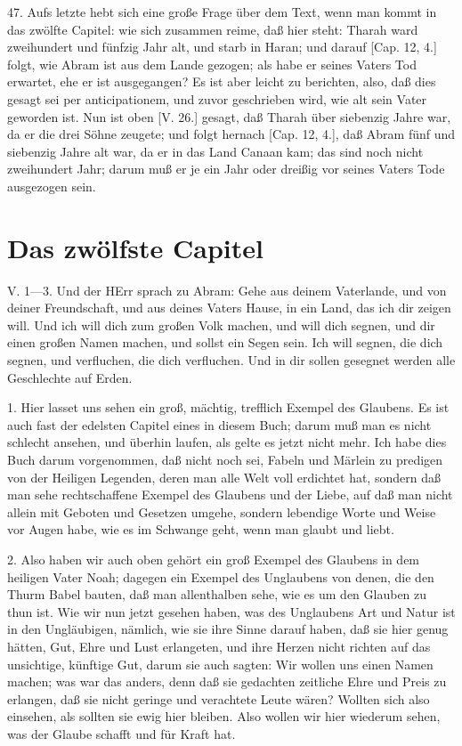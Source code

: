 47. Aufs letzte hebt sich eine große Frage über dem Text, wenn man kommt in das zwölfte Capitel: wie sich zusammen reime, daß hier steht: Tharah ward zweihundert und fünfzig Jahr alt, und starb in Haran; und darauf [Cap. 12, 4.] folgt, wie Abram ist aus dem Lande gezogen; als habe er seines Vaters Tod erwartet, ehe er ist ausgegangen? Es ist aber leicht zu berichten, also, daß dies gesagt sei per anticipationem, und zuvor geschrieben wird, wie alt sein Vater geworden ist. Nun ist oben [V. 26.] gesagt, daß Tharah über siebenzig Jahre war, da er die drei Söhne zeugete; und folgt hernach [Cap. 12, 4.], daß Abram fünf und siebenzig Jahre alt war, da er in das Land Canaan kam; das sind noch nicht zweihundert Jahr; darum muß er je ein Jahr oder dreißig vor seines Vaters Tode ausgezogen sein.

\section{Das zwölfste Capitel}

\begin{schriftzitat}
V. 1—3. Und der HErr sprach zu Abram: Gehe aus deinem Vaterlande, und von deiner Freundschaft, und aus deines Vaters Hause, in ein Land, das ich dir zeigen will. Und ich will dich zum großen Volk machen, und will dich segnen, und dir einen großen Namen machen, und sollst ein Segen sein. Ich will segnen, die dich segnen, und verfluchen, die dich verfluchen. Und in dir sollen gesegnet werden alle Geschlechte auf Erden.
\end{schriftzitat}

1. Hier lasset uns sehen ein groß, mächtig, trefflich Exempel des Glaubens. Es ist auch fast der edelsten Capitel eines in diesem Buch; darum muß man es nicht schlecht ansehen, und überhin laufen, als gelte es jetzt nicht mehr. Ich habe dies Buch darum vorgenommen, daß nicht noch sei, Fabeln und Märlein zu predigen von der Heiligen Legenden, deren man alle Welt voll erdichtet hat, sondern daß man sehe rechtschaffene Exempel des Glaubens und der Liebe, auf daß man nicht allein mit Geboten und Gesetzen umgehe, sondern lebendige Worte und Weise vor Augen habe, wie es im Schwange geht, wenn man glaubt und liebt.

2. Also haben wir auch oben gehört ein groß Exempel des Glaubens in dem heiligen Vater Noah; dagegen ein Exempel des Unglaubens von denen, die den Thurm Babel bauten, daß man allenthalben sehe, wie es um den Glauben zu thun ist. Wie wir nun jetzt gesehen haben, was des Unglaubens Art und Natur ist in den Ungläubigen, nämlich, wie sie ihre Sinne darauf haben, daß sie hier genug hätten, Gut, Ehre und Lust erlangeten, und ihre Herzen nicht richten auf das unsichtige, künftige Gut, darum sie auch sagten: Wir wollen uns einen Namen machen; was war das anders, denn daß sie gedachten zeitliche Ehre und Preis zu erlangen, daß sie nicht geringe und verachtete Leute wären? Wollten sich also einsehen, als sollten sie ewig hier bleiben. Also wollen wir hier wiederum sehen, was der Glaube schafft und für Kraft hat.


